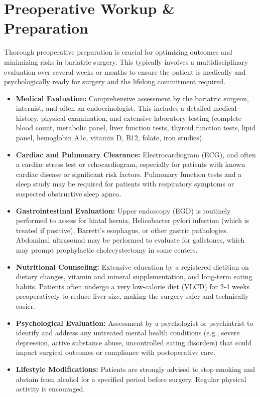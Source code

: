 \section*{Preoperative Workup \& Preparation}
Thorough preoperative preparation is crucial for optimizing outcomes and minimizing risks in bariatric surgery. This typically involves a multidisciplinary evaluation over several weeks or months to ensure the patient is medically and psychologically ready for surgery and the lifelong commitment required.

\begin{itemize}
  \item \textbf{Medical Evaluation:} Comprehensive assessment by the bariatric surgeon, internist, and often an endocrinologist. This includes a detailed medical history, physical examination, and extensive laboratory testing (complete blood count, metabolic panel, liver function tests, thyroid function tests, lipid panel, hemoglobin A1c, vitamin D, B12, folate, iron studies).
  \item \textbf{Cardiac and Pulmonary Clearance:} Electrocardiogram (ECG), and often a cardiac stress test or echocardiogram, especially for patients with known cardiac disease or significant risk factors. Pulmonary function tests and a sleep study may be required for patients with respiratory symptoms or suspected obstructive sleep apnea.
  \item \textbf{Gastrointestinal Evaluation:} Upper endoscopy (EGD) is routinely performed to assess for hiatal hernia, Helicobacter pylori infection (which is treated if positive), Barrett's esophagus, or other gastric pathologies. Abdominal ultrasound may be performed to evaluate for gallstones, which may prompt prophylactic cholecystectomy in some centers.
  \item \textbf{Nutritional Counseling:} Extensive education by a registered dietitian on dietary changes, vitamin and mineral supplementation, and long-term eating habits. Patients often undergo a very low-calorie diet (VLCD) for 2-4 weeks preoperatively to reduce liver size, making the surgery safer and technically easier.
  \item \textbf{Psychological Evaluation:} Assessment by a psychologist or psychiatrist to identify and address any untreated mental health conditions (e.g., severe depression, active substance abuse, uncontrolled eating disorders) that could impact surgical outcomes or compliance with postoperative care.
  \item \textbf{Lifestyle Modifications:} Patients are strongly advised to stop smoking and abstain from alcohol for a specified period before surgery. Regular physical activity is encouraged.

\end{itemize}
